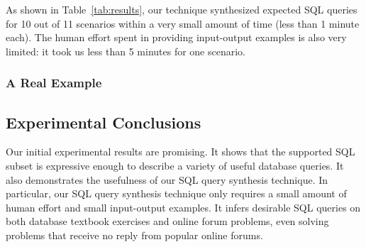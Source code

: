 As shown in Table~\ref{tab:results}, our technique synthesized
expected SQL queries for 10 out of 11 scenarios
within a very small amount of time (less than 1 minute each).
The human effort spent in providing input-output examples
is also very limited: it took us less than 5 minutes for one scenario.


\subsubsection{A Real Example}


\subsection{Experimental Conclusions}

Our initial experimental results are promising.
It shows that the supported SQL subset is
expressive enough to describe a variety of useful database queries.
It also demonstrates the usefulness of our SQL query
synthesis technique.  In particular, our SQL query synthesis technique only requires a small amount of
human effort and small input-output examples. It infers 
desirable SQL queries on both database textbook exercises
and online forum problems, even solving problems that receive no reply
from popular online forums.




